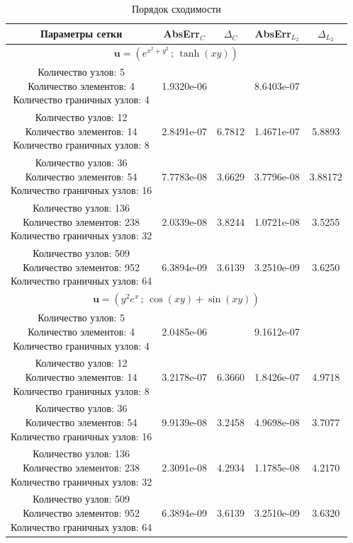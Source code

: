 \documentclass[12pt, a4paper]{article}
\begin{document}
\begin{table}[H]
	\caption{Порядок сходимости}
	\centering
	\footnotesize
	\begin{tabular}{|c|c|c|c|c|}
		\hline
		Параметры сетки & AbsErr$_{C}$ & $\Delta_C$ & AbsErr$_{L_2}$ & $\Delta_{L_2}$ \\ 
		\hline
		\multicolumn{5}{|c|}{$\mathbf{u} = \left(e^{x^2+y^2}\,;\,\tanh(xy)\right)$}\\
		\hline
		\makecell{Количество узлов: 5\\
			Количество элементов: 4\\ Количество граничных узлов: 4} &1.9320e-06&&8.6403e-07&\\
		\hline
		\makecell{Количество узлов: 12\\ Количество элементов: 14\\ Количество граничных узлов: 8} &2.8491e-07&6.7812&1.4671e-07&5.8893\\
		\hline
		\makecell{Количество узлов: 36\\ Количество элементов: 54\\ Количество граничных узлов: 16 } &7.7783e-08&3.6629&3.7796e-08&3.88172\\
		\hline
		\makecell{Количество узлов: 136\\ Количество элементов: 238\\ Количество граничных узлов: 32 } &2.0339e-08& 3.8244&1.0721e-08 &3.5255\\
		\hline
		\makecell{Количество узлов: 509\\ Количество элементов: 952\\ Количество граничных узлов: 64 } &6.3894e-09&3.6139&3.2510e-09 &3.6250\\
		\hline
		\multicolumn{5}{|c|}{$\mathbf{u} = \left(y^2e^x\,;\,\cos(xy)+\sin(xy)\right)$}\\
		\hline
		\makecell{Количество узлов: 5\\
			Количество элементов: 4\\ Количество граничных узлов: 4} &2.0485e-06&&9.1612e-07&\\
		\hline
		\makecell{Количество узлов: 12\\ Количество элементов: 14\\ Количество граничных узлов: 8} &3.2178e-07&6.3660&1.8426e-07&4.9718\\
		\hline
		\makecell{Количество узлов: 36\\ Количество элементов: 54\\ Количество граничных узлов: 16 } &9.9139e-08&3.2458&4.9698e-08&3.7077\\
		\hline
		\makecell{Количество узлов: 136\\ Количество элементов: 238\\ Количество граничных узлов: 32 } &2.3091e-08&4.2934&1.1785e-08 &4.2170\\
		\hline
		\makecell{Количество узлов: 509\\ Количество элементов: 952\\ Количество граничных узлов: 64 } &6.3894e-09&3.6139&3.2510e-09 &3.6320\\
		\hline
	\end{tabular}
\end{table}
\end{document}
